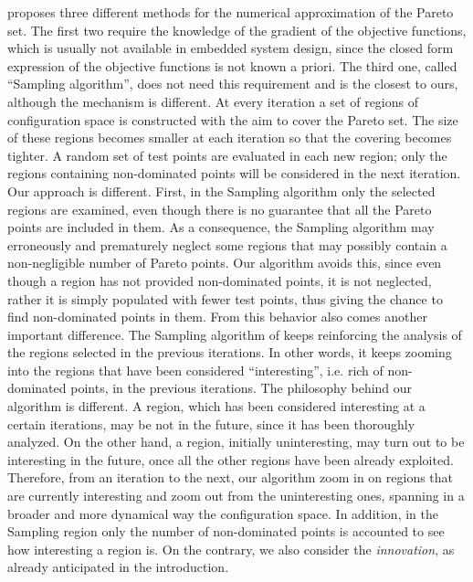 \cite{dellnitz2005covering} proposes three different methods for the numerical approximation of the Pareto set. The first two require the knowledge of the gradient of the objective functions, which is usually not available in embedded system design, since the closed form expression of the objective functions is not known a priori. The third one, called ``Sampling algorithm'', does not need this requirement and is the closest to ours, although the mechanism is different. At every iteration a set of regions of configuration space is constructed with the aim to cover the Pareto set. The size of these regions becomes smaller at each iteration so that the covering becomes tighter. A random set of test points are evaluated in each new region; only the regions containing non-dominated points will be considered in the next iteration. Our approach is different. First, in the Sampling algorithm only the selected regions are examined, even though there is no guarantee that all the Pareto points are included in them. As a consequence, the Sampling algorithm may erroneously and prematurely neglect some regions that may possibly contain a non-negligible number of Pareto points. Our algorithm avoids this, since even though a region has not provided non-dominated points, it is not neglected, rather it is simply populated with fewer test points, thus giving the chance to find non-dominated points in them. From this behavior also comes another important difference. The Sampling algorithm of \cite{dellnitz2005covering} keeps reinforcing the analysis of the regions selected in the previous iterations. In other words, it keeps zooming into the regions that have been considered ``interesting'', i.e. rich of non-dominated points, in the previous iterations. The philosophy behind our algorithm is different. A region, which has been considered interesting at a certain iterations, may be not in the future, since it has been thoroughly analyzed. On the other hand, a region, initially uninteresting, may turn out to be interesting in the future, once all the other regions have been already exploited. Therefore, from an iteration to the next, our algorithm zoom in on regions that are currently interesting and zoom out from the uninteresting ones,  spanning in a broader and more dynamical way the configuration space. In addition, in the Sampling region only the number of non-dominated points is accounted to see how interesting a region is. On the contrary, we also consider the \emph{innovation}, as already anticipated in the introduction.



